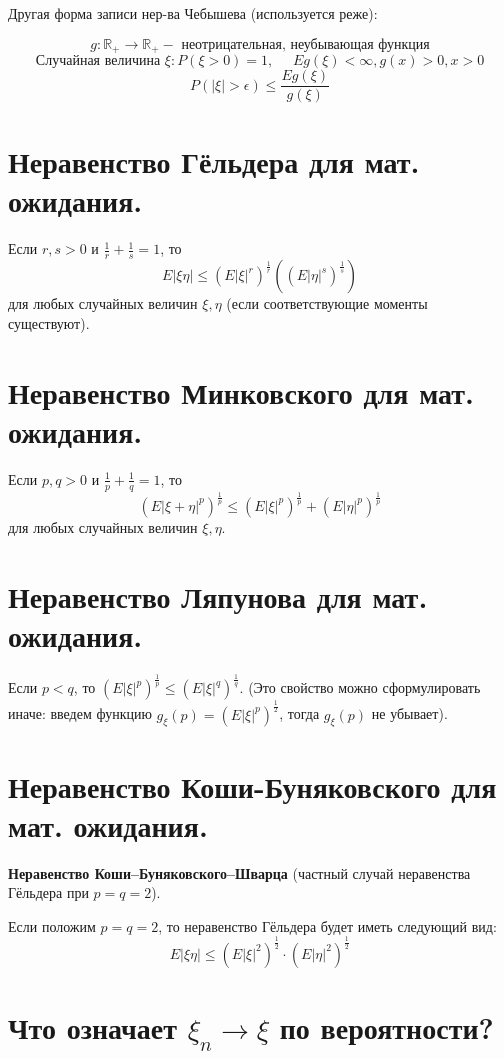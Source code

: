 \noindent Другая форма записи нер-ва Чебышева (используется реже):

\[ g: \mathbb{R}_{+} \to \mathbb{R}_{+} - \text{ неотрицательная, неубывающая функция} \]
\[ \text{Случайная величина } \xi : P(\xi > 0) = 1, ~~~~~~ Eg(\xi) < \infty, g(x) > 0, x > 0 \]
\[ P (|\xi| > \epsilon) \le \frac{Eg(\xi)}{g(\xi)} \]

\section{Неравенство Гёльдера для мат. ожидания.}

Если $r, s > 0$ и $\frac{1}{r} + \frac{1}{s} = 1$, то
\[ E |\xi \eta| \le (E|\xi|^r)^{\frac{1}{r}} ( ( E |\eta|^s )^{\frac{1}{s}} ) \]
для любых случайных величин $\xi, \eta$ (если соответствующие моменты существуют).

\section{Неравенство Минковского для мат. ожидания.}

Если $p, q > 0$ и $\frac{1}{p} + \frac{1}{q} = 1$, то
\[ ( E |\xi + \eta|^p )^{\frac{1}{p}} \le ( E |\xi|^p )^{\frac{1}{p}} + ( E |\eta|^p )^{\frac{1}{p}} \]
для любых случайных величин $\xi, \eta$.

\section{Неравенство Ляпунова для мат. ожидания.}

Если $p < q$, то $(E |\xi|^p)^{\frac{1}{p}} \le (E |\xi|^q)^{\frac{1}{q}}$. (Это свойство можно сформулировать иначе: введем функцию $g_{\xi}(p) = (E |\xi|^p)^{\frac{1}{2}}$, тогда $g_{\xi}(p)$ не убывает).

\section{Неравенство Коши-Буняковского для мат. ожидания.}

\textbf{Неравенство Коши–Буняковского–Шварца} (частный случай неравенства Гёльдера при $p=q=2$).

Если положим $p = q = 2$, то неравенство Гёльдера будет иметь следующий вид:
\[ E |\xi \eta| \le ( E |\xi|^2 )^{\frac{1}{2}} \cdot ( E |\eta|^2 )^{\frac{1}{2}} \]

\section{Что означает $\xi_n \to \xi$ по вероятности?}

